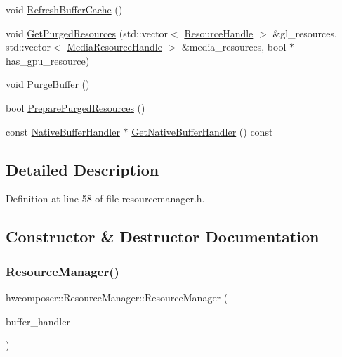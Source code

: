 \begin{DoxyCompactItemize}
void \mbox{\hyperlink{classhwcomposer_1_1ResourceManager_a303f37d04b5a8aa1aa91f579ed897b33}{Refresh\+Buffer\+Cache}} ()
\item 
void \mbox{\hyperlink{classhwcomposer_1_1ResourceManager_afda313d41d4a7d91f2c8e7fe99779f11}{Get\+Purged\+Resources}} (std\+::vector$<$ \mbox{\hyperlink{namespacehwcomposer_a963c5a1d5902d2d05710dba19af35b48}{Resource\+Handle}} $>$ \&gl\+\_\+resources, std\+::vector$<$ \mbox{\hyperlink{namespacehwcomposer_aa99e35835961ac7d6baa59a04131ff42}{Media\+Resource\+Handle}} $>$ \&media\+\_\+resources, bool $\ast$has\+\_\+gpu\+\_\+resource)
\item 
void \mbox{\hyperlink{classhwcomposer_1_1ResourceManager_ab30302bab7dc3e8609a431299e16a8f4}{Purge\+Buffer}} ()
\item 
bool \mbox{\hyperlink{classhwcomposer_1_1ResourceManager_a7ffb53b713befaf75975e667d21f1612}{Prepare\+Purged\+Resources}} ()
\item 
const \mbox{\hyperlink{classhwcomposer_1_1NativeBufferHandler}{Native\+Buffer\+Handler}} $\ast$ \mbox{\hyperlink{classhwcomposer_1_1ResourceManager_a3835ffcbf6c6ca862ad72744c95d087d}{Get\+Native\+Buffer\+Handler}} () const
\end{DoxyCompactItemize}


\subsection{Detailed Description}


Definition at line 58 of file resourcemanager.\+h.



\subsection{Constructor \& Destructor Documentation}
\mbox{\label{classhwcomposer_1_1ResourceManager_aa22da4e56a203700e5b43ec46d670768}} 
\subsubsection{\texorpdfstring{Resource\+Manager()}{ResourceManager()}}
{\footnotesize\ttfamily hwcomposer\+::\+Resource\+Manager\+::\+Resource\+Manager (\begin{DoxyParamCaption}\item[{\mbox{\hyperlink{classhwcomposer_1_1NativeBufferHandler}{Native\+Buffer\+Handler}} $\ast$}]{buffer\+\_\+handler }\end{DoxyParamCaption})}



